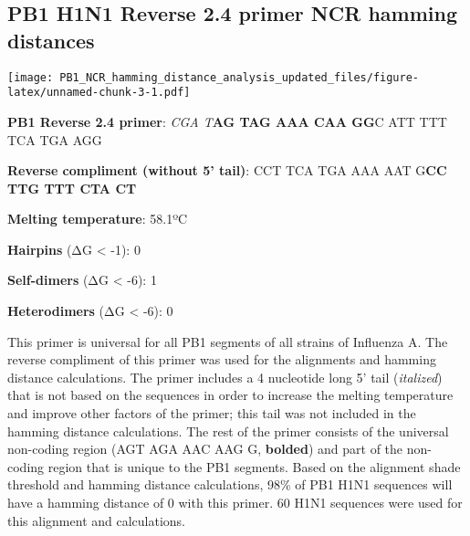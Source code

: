 \documentclass[
]{article}
\newenvironment{Shaded}{\begin{snugshade}}{\end{snugshade}}
\newcommand{\AttributeTok}[1]{\textcolor[rgb]{0.77,0.63,0.00}{#1}}
\newcommand{\DecValTok}[1]{\textcolor[rgb]{0.00,0.00,0.81}{#1}}
\newcommand{\FunctionTok}[1]{\textcolor[rgb]{0.00,0.00,0.00}{#1}}
\newcommand{\NormalTok}[1]{#1}
\newcommand{\OtherTok}[1]{\textcolor[rgb]{0.56,0.35,0.01}{#1}}
\newcommand{\SpecialCharTok}[1]{\textcolor[rgb]{0.00,0.00,0.00}{#1}}
\newcommand{\StringTok}[1]{\textcolor[rgb]{0.31,0.60,0.02}{#1}}
\begin{document}
\hypertarget{pb1-h1n1-reverse-2.4-primer-ncr-hamming-distances}{%
\subsection{PB1 H1N1 Reverse 2.4 primer NCR hamming
distances}\label{pb1-h1n1-reverse-2.4-primer-ncr-hamming-distances}}

\begin{Shaded}
\end{Shaded}

\texttt{[image: PB1\_NCR\_hamming\_distance\_analysis\_updated\_files/figure-latex/unnamed-chunk-3-1.pdf]}

\textbf{PB1 Reverse 2.4 primer}: \emph{CGA T}\textbf{AG TAG AAA CAA GG}C
ATT TTT TCA TGA AGG

\textbf{Reverse compliment (without 5' tail)}: CCT TCA TGA AAA AAT
G\textbf{CC TTG TTT CTA CT}

\textbf{Melting temperature}: 58.1ºC

\textbf{Hairpins} (ΔG \textless{} -1): 0

\textbf{Self-dimers} (ΔG \textless{} -6): 1

\textbf{Heterodimers} (ΔG \textless{} -6): 0

This primer is universal for all PB1 segments of all strains of
Influenza A. The reverse compliment of this primer was used for the
alignments and hamming distance calculations. The primer includes a 4
nucleotide long 5' tail (\emph{italized}) that is not based on the
sequences in order to increase the melting temperature and improve other
factors of the primer; this tail was not included in the hamming
distance calculations. The rest of the primer consists of the universal
non-coding region (AGT AGA AAC AAG G, \textbf{bolded}) and part of the
non-coding region that is unique to the PB1 segments. Based on the
alignment shade threshold and hamming distance calculations, 98\% of PB1
H1N1 sequences will have a hamming distance of 0 with this primer. 60
H1N1 sequences were used for this alignment and calculations.
\end{document}
